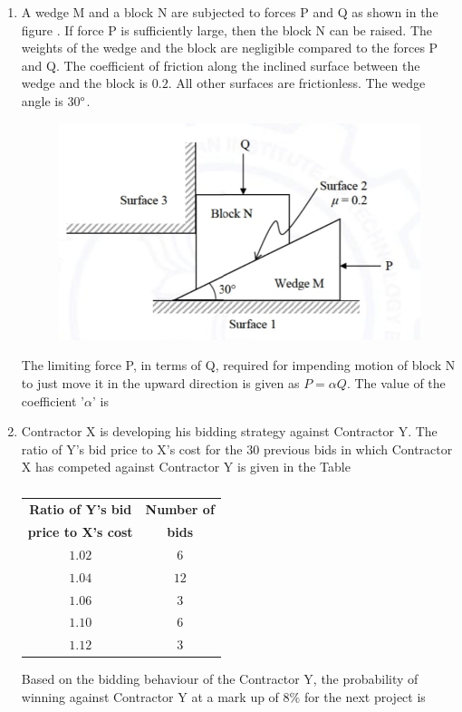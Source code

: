 \documentclass[journal,12pt,onecolumn]{article}
\theoremstyle{remark}
\begin{document}
\begin{enumerate}
\item A wedge M and a block N are subjected to forces P and Q as shown in the figure . If force P is sufficiently large, then the block N can be raised. The weights of the wedge and the block are negligible compared to the forces P and Q. The coefficient of friction \brak{\mu} along the inclined surface between the wedge and the block is $0.2$. All other surfaces are frictionless. The wedge angle is 30$\degree$.
\begin{figure}[H]
    \centering
    \includegraphics[width=0.7\columnwidth]{figs/1q29.jpg}
    \caption{}
    \label{fig:q29}
\end{figure}
The limiting force P, in terms of Q, required for impending motion of block N to just move it in the upward direction is given as $P = \alpha Q$. The value of the coefficient '$\alpha$'  is

\hfill{}
\begin{enumerate}
\end{enumerate}

\item Contractor X is developing his bidding strategy against Contractor Y. The ratio of Y's bid price to X's cost for the 30 previous bids in which Contractor X has competed against Contractor Y is given in the Table
\begin{table}[H]
    \centering
    \begin{tabular}{|c|c|}
    \hline
    \textbf{Ratio of Y's bid} & \textbf{Number of} \\
    \textbf{price to X's cost} & \textbf{bids} \\
    \hline
    $1.02$ & $6$ \\
    \hline
    $1.04$ & $12$ \\
    \hline
    $1.06$ & $3$ \\
    \hline
    $1.10$ & $6$ \\
    \hline
    $1.12$ & $3$ \\
    \hline
    \end{tabular}
    \caption{}
    \label{tab:q30}
\end{table}
Based on the bidding behaviour of the Contractor Y, the probability of winning against Contractor Y at a mark up of $8\%$ for the next project is


\end{enumerate}
\end{document}
